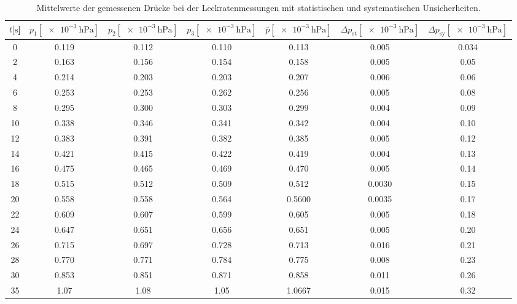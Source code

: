 \begin{table}[H]
  \centering
    \caption{Mittelwerte der gemessenen Drücke bei der Leckratenmessungen mit statistischen und systematischen Unsicherheiten.}
    \label{tab:Turbo_Leck3}
    \small{
    \begin{tabular}{
      S[table-format=3.0] 
      S[table-format=1.3] S[table-format=1.3] S[table-format=1.3]
      S[table-format=1.4] S[table-format=1.4] S[table-format=1.3]
      }
      \toprule
      {$t [\si{\second}$]} &
      {$p_1 [\SI{e-3}{\hecto\pascal}]$} & {$p_2 [\SI{e-3}{\hecto\pascal}]$} & {$p_3 [\SI{e-3}{\hecto\pascal}]$} &
      {$\bar{p} [\SI{e-3}{\hecto\pascal}]$} & {$\Delta p_\text{st} [\SI{e-3}{\hecto\pascal}]$} & {$\Delta p_\text{sy} [\SI{e-3}{\hecto\pascal}]$}\\
         & 0.119 & 0.112 &  0.110 &  0.113  & 0.005 & 0.034 \\
      2   & 0.163 & 0.156 &  0.154 &  0.158  & 0.005 & 0.05  \\
      4   & 0.214 & 0.203 &  0.203 &  0.207  & 0.006 & 0.06  \\
      6   & 0.253 & 0.253 &  0.262 &  0.256  & 0.005 & 0.08  \\
      8   & 0.295 & 0.300 &  0.303 &  0.299  & 0.004 & 0.09  \\
      10  & 0.338 & 0.346 &  0.341 &  0.342  & 0.004 & 0.10  \\
      12  & 0.383 & 0.391 &  0.382 &  0.385  & 0.005 & 0.12  \\
      14  & 0.421 & 0.415 &  0.422 &  0.419  & 0.004 & 0.13  \\
      16  & 0.475 & 0.465 &  0.469 &  0.470  & 0.005 & 0.14  \\
      18  & 0.515 & 0.512 &  0.509 &  0.512  & 0.0030& 0.15  \\
      20  & 0.558 & 0.558 &  0.564 &  0.5600 & 0.0035& 0.17  \\
      22  & 0.609 & 0.607 &  0.599 &  0.605  & 0.005 & 0.18  \\
      24  & 0.647 & 0.651 &  0.656 &  0.651  & 0.005 & 0.20  \\
      26  & 0.715 & 0.697 &  0.728 &  0.713  & 0.016 & 0.21  \\
      28  & 0.770 & 0.771 &  0.784 &  0.775  & 0.008 & 0.23  \\
      30  & 0.853 & 0.851 &  0.871 &  0.858  & 0.011 & 0.26  \\
      35  & 1.07  & 1.08  &  1.05  &  1.0667 & 0.015 & 0.32  \\

\end{tabular}}
\end{table}
